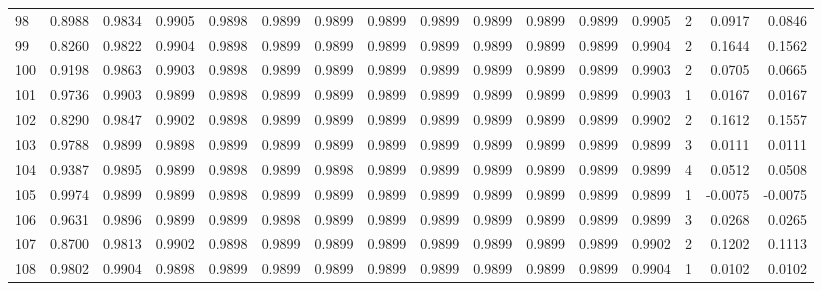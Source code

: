 \begin{tabular}{lrrrrrrrrrrrrrrr}
98  &      0.8988 &  0.9834 &  0.9905 &  0.9898 &  0.9899 &  0.9899 &  0.9899 &  0.9899 &  0.9899 &  0.9899 &   0.9899 &     0.9905 &      2 &                    0.0917 &                     0.0846 \\
99  &      0.8260 &  0.9822 &  0.9904 &  0.9898 &  0.9899 &  0.9899 &  0.9899 &  0.9899 &  0.9899 &  0.9899 &   0.9899 &     0.9904 &      2 &                    0.1644 &                     0.1562 \\
100 &      0.9198 &  0.9863 &  0.9903 &  0.9898 &  0.9899 &  0.9899 &  0.9899 &  0.9899 &  0.9899 &  0.9899 &   0.9899 &     0.9903 &      2 &                    0.0705 &                     0.0665 \\
101 &      0.9736 &  0.9903 &  0.9899 &  0.9898 &  0.9899 &  0.9899 &  0.9899 &  0.9899 &  0.9899 &  0.9899 &   0.9899 &     0.9903 &      1 &                    0.0167 &                     0.0167 \\
102 &      0.8290 &  0.9847 &  0.9902 &  0.9898 &  0.9899 &  0.9899 &  0.9899 &  0.9899 &  0.9899 &  0.9899 &   0.9899 &     0.9902 &      2 &                    0.1612 &                     0.1557 \\
103 &      0.9788 &  0.9899 &  0.9898 &  0.9899 &  0.9899 &  0.9899 &  0.9899 &  0.9899 &  0.9899 &  0.9899 &   0.9899 &     0.9899 &      3 &                    0.0111 &                     0.0111 \\
104 &      0.9387 &  0.9895 &  0.9899 &  0.9898 &  0.9899 &  0.9898 &  0.9899 &  0.9899 &  0.9899 &  0.9899 &   0.9899 &     0.9899 &      4 &                    0.0512 &                     0.0508 \\
105 &      0.9974 &  0.9899 &  0.9899 &  0.9898 &  0.9899 &  0.9899 &  0.9899 &  0.9899 &  0.9899 &  0.9899 &   0.9899 &     0.9899 &      1 &                   -0.0075 &                    -0.0075 \\
106 &      0.9631 &  0.9896 &  0.9899 &  0.9899 &  0.9898 &  0.9899 &  0.9899 &  0.9899 &  0.9899 &  0.9899 &   0.9899 &     0.9899 &      3 &                    0.0268 &                     0.0265 \\
107 &      0.8700 &  0.9813 &  0.9902 &  0.9898 &  0.9899 &  0.9899 &  0.9899 &  0.9899 &  0.9899 &  0.9899 &   0.9899 &     0.9902 &      2 &                    0.1202 &                     0.1113 \\
108 &      0.9802 &  0.9904 &  0.9898 &  0.9899 &  0.9899 &  0.9899 &  0.9899 &  0.9899 &  0.9899 &  0.9899 &   0.9899 &     0.9904 &      1 &                    0.0102 &                     0.0102 \\

\end{tabular}

